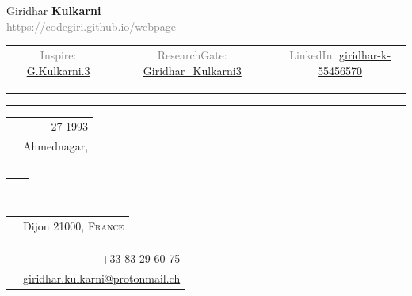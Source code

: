 
\setlength{\parindent}{0pt}
\pagestyle{empty}
\begin{center}
{	\huge \textsf{Giridhar \textbf{Kulkarni}}
} \\[1ex]
\href{https://codegiri.github.io/webpage}{\textcolor{gray}{https://codegiri.github.io/webpage}}
\\
\textcolor{gray}{\scriptsize%
\begin{tabular}{c|c|c}
	Inspire: \href{https://inspirehep.net/authors/1727127}{G.Kulkarni.3}
	&
	ResearchGate: \href{https://www.researchgate.net/profile/Giridhar_Kulkarni3}{Giridhar\_Kulkarni3}
	&
	LinkedIn: \href{https://www.linkedin.com/in/giridhar-k-55456570}{giridhar-k-55456570}
\end{tabular}
}
\end{center}
\rule[1em]{\linewidth}{.4pt}%
\vspace{-1em}
\rule[1em]{\linewidth}{1pt}
%
\begin{minipage}{0.74\textwidth}
\begin{tabularx}{1\textwidth}{M | D}
		&	27 1993
	\\
		&	Ahmednagar, \textsc{\india}
\end{tabularx}
\begin{tabularx}{1\textwidth}{M | D}
			&	
	\\
			& 	
\end{tabularx}
\\[.5em]
\begin{tabularx}{1\textwidth}{M | D}
		& 	Dijon 21000, \textsc{France}
\end{tabularx}
\begin{tabularx}{1\textwidth}{M | D}
		&	\href{tel:+33783296075}{+33\space\textperiodcentered{} 83 29 60 75}
	\\

			&	\href{mailto:giridhar.kulkarni@protonmail.ch}{giridhar.kulkarni@protonmail.ch}%
\end{tabularx}
\end{minipage}
